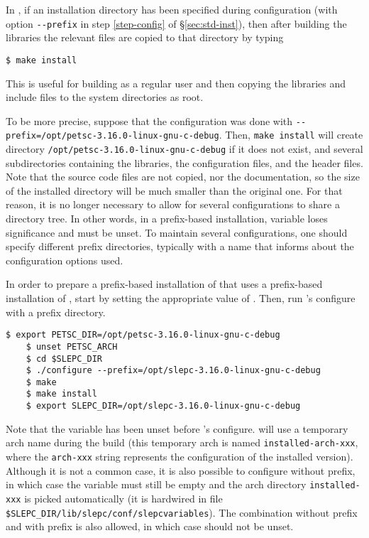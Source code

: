 In \petsc, if an installation directory has been specified during configuration (with option \Verb!--prefix! in step \ref{step-config} of \S\ref{sec:std-inst}), then after building the libraries the relevant files are copied to that directory by typing
	\begin{Verbatim}[fontsize=\small]
	$ make install
	\end{Verbatim}
	This is useful for building as a regular user and then copying the libraries and include files to the system directories as root.

To be more precise, suppose that the configuration was done with \texttt{-{}-prefix=/opt/petsc-3.16.0-linux-gnu-c-debug}. Then, \texttt{make install} will create directory \texttt{/opt/petsc-3.16.0-linux-gnu-c-debug} if it does not exist, and several subdirectories containing the libraries, the configuration files, and the header files. Note that the source code files are not copied, nor the documentation, so the size of the installed directory will be much smaller than the original one. For that reason, it is no longer necessary to allow for several configurations to share a directory tree. In other words, in a prefix-based installation, variable  loses significance and must be unset. To maintain several configurations, one should specify different prefix directories, typically with a name that informs about the configuration options used.

In order to prepare a prefix-based installation of \slepc that uses a prefix-based installation of \petsc, start by setting the appropriate value of . Then, run \slepc's configure with a prefix directory.
	\begin{Verbatim}[fontsize=\small,numbers=none]
	$ export PETSC_DIR=/opt/petsc-3.16.0-linux-gnu-c-debug
	$ unset PETSC_ARCH
	$ cd $SLEPC_DIR
	$ ./configure --prefix=/opt/slepc-3.16.0-linux-gnu-c-debug
	$ make
	$ make install
	$ export SLEPC_DIR=/opt/slepc-3.16.0-linux-gnu-c-debug
	\end{Verbatim}
Note that the variable  has been unset before \slepc's configure. \slepc will use a temporary arch name during the build (this temporary arch is named \texttt{installed-arch-xxx}, where the \texttt{arch-xxx} string represents the configuration of the installed \petsc version). Although it is not a common case, it is also possible to configure \slepc without prefix, in which case the  variable must still be empty and the arch directory \texttt{installed-xxx} is picked automatically (it is hardwired in file \texttt{\$SLEPC\_DIR/lib/slepc/conf/slepcvariables}). The combination \petsc without prefix and \slepc with prefix is also allowed, in which case  should not be unset.

